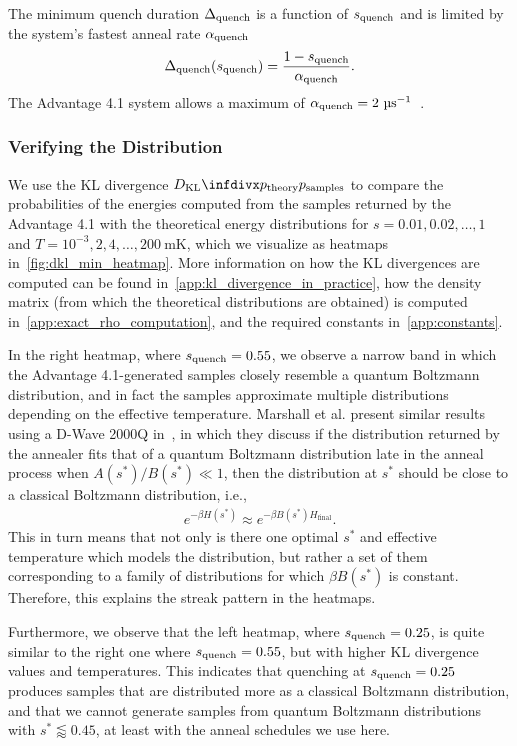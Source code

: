 The minimum quench duration \( \Delta_{\text{quench}} \) is a function of \( s_{\text{quench}} \) and is limited by the system's fastest anneal rate \( \alpha_{\text{quench}} \)
\begin{align}
    \Delta_{\text{quench}}(s_{\text{quench}}) = \frac{1 - s_{\text{quench}}}{\alpha_{\text{quench}}}.
\end{align}
The Advantage 4.1 system allows a maximum of \( \alphaquench = 2 \ \si{\micro\second}^{-1} \)~\cite{dwave_solver_parameters}.

\subsubsection{Verifying the Distribution}\label{sec:qbm_verifying_distribution}
We use the KL divergence \( \DKL{\ptheory}{\psamples} \) to compare the probabilities of the energies computed from the samples returned by the Advantage 4.1 with the theoretical energy distributions for \( s = 0.01, 0.02, \dots, 1 \) and \( T = 10^{-3}, 2, 4, \dots, 200 \ \si{\milli\kelvin} \), which we visualize as heatmaps in~\cref{fig:dkl_min_heatmap}.
More information on how the KL divergences are computed can be found in~\cref{app:kl_divergence_in_practice}, how the density matrix (from which the theoretical distributions are obtained) is computed in~\cref{app:exact_rho_computation}, and the required constants in~\cref{app:constants}.

In the right heatmap, where \( s_{\text{quench}} = 0.55 \), we observe a narrow band in which the Advantage 4.1-generated samples closely resemble a quantum Boltzmann distribution, and in fact the samples approximate multiple distributions depending on the effective temperature.
Marshall et al. present similar results using a D-Wave 2000Q in~\cite{marshall_2019}, in which they discuss if the distribution returned by the annealer fits that of a quantum Boltzmann distribution late in the anneal process when \( A(s^*) / B(s^*) \ll 1 \), then the distribution at \( s^* \) should be close to a classical Boltzmann distribution, i.e.,
\begin{align}
    e^{-\beta H(s^*)} \approx e^{-\beta B(s^*) H_\text{final}}.
\end{align}
This in turn means that not only is there one optimal \( s^* \) and effective temperature which models the distribution, but rather a set of them corresponding to a family of distributions for which \( \beta B(s^*) \) is constant.
Therefore, this explains the streak pattern in the heatmaps.

Furthermore, we observe that the left heatmap, where \( s_{\text{quench}} = 0.25 \), is quite similar to the right one where \( s_{\text{quench}} = 0.55 \), but with higher KL divergence values and temperatures.
This indicates that quenching at \( s_{\text{quench}} = 0.25 \) produces samples that are distributed more as a classical Boltzmann distribution, and that we cannot generate samples from quantum Boltzmann distributions with \( s^* \lessapprox 0.45 \), at least with the anneal schedules we use here.

